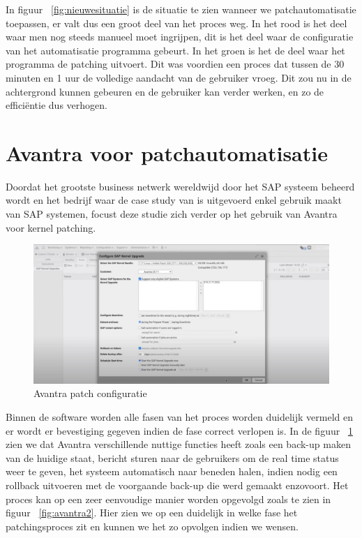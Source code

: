 In figuur ~\ref{fig:nieuwesituatie} is de situatie te zien wanneer we patchautomatisatie toepassen, er valt dus een groot deel van het proces weg. In het rood is het deel
waar men nog steeds manueel moet ingrijpen, dit is het deel waar de configuratie van het automatisatie programma gebeurt. In het groen is het de deel waar het programma de patching uitvoert. Dit was voordien een proces dat tussen de 30 minuten en 1 uur de volledige aandacht van de 
gebruiker vroeg. Dit zou nu in de achtergrond kunnen gebeuren en de gebruiker kan verder werken, en zo de efficiëntie dus verhogen. \\

\section{Avantra voor patchautomatisatie}
Doordat het grootste business netwerk wereldwijd door het SAP systeem beheerd wordt \autocite{Laborde2024} en het bedrijf waar de case study van is uitgevoerd enkel gebruik maakt van SAP systemen, focust deze studie zich verder op het gebruik van Avantra voor kernel patching.

\begin{figure}[h]
    \centering
    \includegraphics[width=\textwidth]{avantra1.png}
    \caption{Avantra patch configuratie}
     \label{fig:avantra1}
\end{figure}
\newpage


Binnen de software worden alle fasen van het proces worden duidelijk vermeld en er wordt er bevestiging gegeven indien de fase correct verlopen is. In de figuur ~\ref{fig:avantra1} zien we dat Avantra verschillende
nuttige functies heeft zoals een back-up maken van de huidige staat, bericht sturen naar de gebruikers om de real time status weer
   te geven, het systeem automatisch naar beneden halen, indien nodig een rollback uitvoeren met de voorgaande back-up die werd gemaakt enzovoort. Het proces kan op een zeer eenvoudige manier worden opgevolgd zoals te zien in figuur ~\ref{fig:avantra2}. Hier zien we op een duidelijk in welke fase het patchingsproces zit en kunnen we het zo opvolgen indien we wensen.\\


